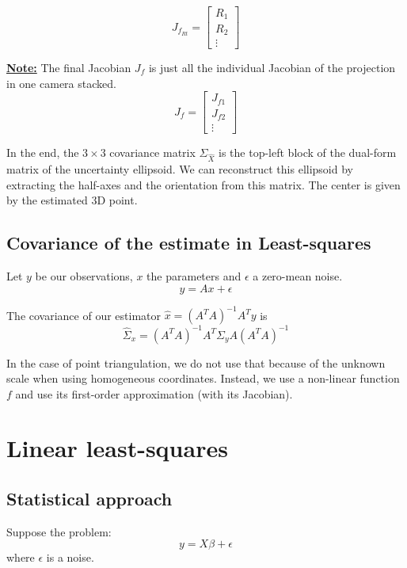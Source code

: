 \begin{equation}
    J_{f_{Rt}} = \left[\begin{array}{c}
        R_1 \\ R_2 \\ \vdots
    \end{array}\right]
\end{equation}

\textbf{\underline{Note:}} The final Jacobian $J_f$ is just all the individual Jacobian of the projection in one camera stacked.
\begin{equation}
    J_f = \left[\begin{array}{c}
        J_{f1} \\ J_{f2} \\ \vdots
    \end{array}\right]
\end{equation}

In the end, the $3\times3$ covariance matrix $\Sigma_{\hat{X}}$ is the top-left block of the dual-form matrix of the uncertainty ellipsoid. We can reconstruct this ellipsoid by extracting the half-axes and the orientation from this matrix. The center is given by the estimated 3D point.


\subsection{Covariance of the estimate in Least-squares}
Let $y$ be our observations, $x$ the parameters and $\epsilon$ a zero-mean noise.
\begin{equation}
    y = Ax+\epsilon
\end{equation}

The covariance of our estimator $\hat{x} = (A^T A)^{-1} A^T y$ is
\begin{equation}
    \hat{\Sigma}_x = (A^T A)^{-1} A^T \Sigma_y A (A^T A)^{-1}
\end{equation}

In the case of point triangulation, we do not use that because of the unknown scale when using homogeneous coordinates. Instead, we use a non-linear function $f$ and use its first-order approximation (with its Jacobian).

\section{Linear least-squares}
\subsection{Statistical approach}
Suppose the problem:
\begin{equation}
    y = X\beta + \epsilon
\end{equation}
where $\epsilon$ is a noise.

